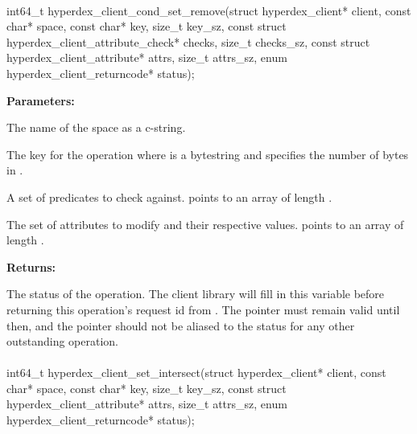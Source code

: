 \paragraph{}
\label{api:c:cond_set_remove}
\begin{ccode}
int64_t hyperdex_client_cond_set_remove(struct hyperdex_client* client,
        const char* space,
        const char* key, size_t key_sz,
        const struct hyperdex_client_attribute_check* checks, size_t checks_sz,
        const struct hyperdex_client_attribute* attrs, size_t attrs_sz,
        enum hyperdex_client_returncode* status);
\end{ccode}
\funcdesc 

\noindent\textbf{Parameters:}
\begin{description}[labelindent=\widthof{{\code{checks}, \code{checks\_sz}}},leftmargin=*,noitemsep,nolistsep,align=right]
\item[\code{space}] The name of the space as a c-string.
\item[\code{key}, \code{key\_sz}] The key for the operation where  is a bytestring and  specifies the number of bytes in .
\item[\code{checks}, \code{checks\_sz}] A set of predicates to check against.   points to an array of length .
\item[\code{attrs}, \code{attrs\_sz}] The set of attributes to modify and their respective values.   points to an array of length .
\end{description}

\noindent\textbf{Returns:}
\begin{description}[labelindent=\widthof{{\code{status}}},leftmargin=*,noitemsep,nolistsep,align=right]
\item[\code{status}] The status of the operation.  The client library will fill in this variable before returning this operation's request id from .  The pointer must remain valid until then, and the pointer should not be aliased to the status for any other outstanding operation.
\end{description}

\paragraph{}
\label{api:c:set_intersect}
\begin{ccode}
int64_t hyperdex_client_set_intersect(struct hyperdex_client* client,
        const char* space,
        const char* key, size_t key_sz,
        const struct hyperdex_client_attribute* attrs, size_t attrs_sz,
        enum hyperdex_client_returncode* status);
\end{ccode}
\funcdesc 

